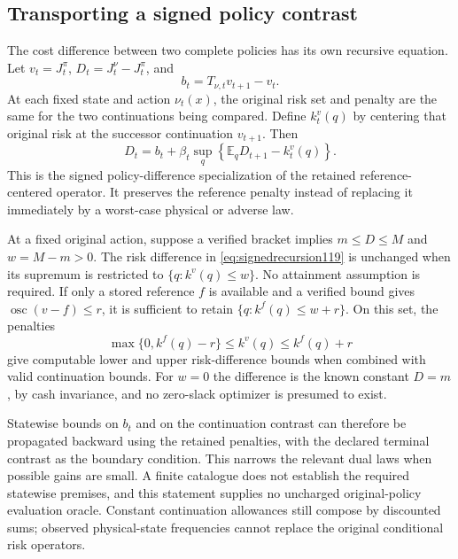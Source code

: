 \subsection{Transporting a signed policy contrast}
The cost difference between two complete policies has its own recursive
equation.  Let $v_t=J_t^\pi$, $D_t=J_t^\nu-J_t^\pi$, and
\[
 b_t=T_{\nu,t}v_{t+1}-v_t.
\]
At each fixed state and action $\nu_t(x)$, the original risk set and
penalty are the same for the two continuations being compared.  Define
$k_t^{v}(q)$ by centering that original risk at the successor
continuation $v_{t+1}$.  Then
\begin{equation}\label{eq:signedrecursion119}
 D_t=b_t+\beta_t\sup_q\left\{\mathbb E_qD_{t+1}-k_t^v(q)\right\}.
\end{equation}
This is the signed policy-difference specialization of the retained
reference-centered operator.  It preserves the reference penalty instead
of replacing it immediately by a worst-case physical or adverse law.

\begin{proposition}
\label{prop:nearactive119}
At a fixed original action, suppose a verified bracket implies
$m\le D\le M$ and $w=M-m>0$.  The risk difference in
\eqref{eq:signedrecursion119} is unchanged when its supremum is
restricted to $\{q:k^v(q)\le w\}$.  No attainment assumption is
required.  If only a stored reference $f$ is available and a verified
bound gives $\operatorname{osc}(v-f)\le r$, it is sufficient to
retain $\{q:k^f(q)\le w+r\}$.  On this set, the penalties
\[
 \max\{0,k^f(q)-r\}\le k^v(q)\le k^f(q)+r
\]
give computable lower and upper risk-difference bounds when combined
with valid continuation bounds.  For $w=0$ the difference is the
known constant $D=m$, by cash invariance, and no zero-slack optimizer
is presumed to exist.
\end{proposition}

Statewise bounds on $b_t$ and on the continuation contrast can therefore
be propagated backward using the retained penalties, with the declared
terminal contrast as the boundary condition.  This narrows the relevant
dual laws when possible gains are small.  A finite catalogue does not
establish the required statewise premises, and this statement supplies
no uncharged original-policy evaluation oracle.  Constant continuation
allowances still compose by discounted sums; observed physical-state
frequencies cannot replace the original conditional risk operators.
